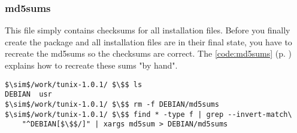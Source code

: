 \subsubsection{md5sums}
This file simply contains checksums for all installation files. Before you
finally create the package and all installation files are in their final state,
you have to recreate the md5sums so the checksums are correct. The
\lstlistingname{} \ref{code:md5sums} (p. \pageref{code:md5sums}) explains how to
recreate these sums "by hand".
\begin{lstlisting}[caption=Recreating md5sums for DEBIAN/md5sums,
label=code:md5sums, float=ht]
$\sim$/work/tunix-1.0.1/ $\$$ ls
DEBIAN  usr
$\sim$/work/tunix-1.0.1/ $\$$ rm -f DEBIAN/md5sums
$\sim$/work/tunix-1.0.1/ $\$$ find * -type f | grep --invert-match\ 
	"^DEBIAN[$\$$/]" | xargs md5sum > DEBIAN/md5sums
\end{lstlisting}

